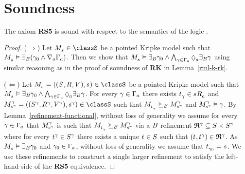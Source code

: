 \section{Soundness}\label{rml-s5-soundness}

\begin{lemma}\label{rml-s5-rs5}
The axiom {\bf RS5} is sound with respect to the semantics of the logic \logicRmlS{}.
\end{lemma}

\begin{proof}
($\Rightarrow$) 
Let $\kPModel{\kStateS} \in \classS$ be a pointed Kripke model such that $\kPModel{\kStateS} \entails \somerefsBs (\gamma_0 \land \coversA \Gamma_\agentA)$.
Then we show that $\kPModel{\kStateS} \entails \somerefsBs \gamma_0 \land \bigwedge_{\gamma \in \Gamma_\agentA} \possibleA \somerefsBs \gamma$ using similar reasoning as in the proof of soundness of {\bf RK} in Lemma~\ref{rml-k-rk}.

($\Leftarrow$)
Let $\kPModelAndTuple{\kStateS} \in \classS$ be a pointed Kripke model such that $\kPModel{\kStateS} \entails \somerefsBs \gamma_0 \land \bigwedge_{\gamma \in \Gamma_\agentA} \possibleA \somerefsBs \gamma$.
For every $\gamma \in \Gamma_\agentA$ there exists $\kStateT_\gamma \in \kSuccessorsA{\kStateS}$ and $\kPModelAndTuple[\gamma]{\kStateS[\gamma]} \in \classS$ such that $\kPModel{\kStateT_\gamma} \simulatesBs \kPModel[\gamma]{\kStateS[\gamma]}$ and $\kPModel[\gamma]{\kStateS[\gamma]} \entails \gamma$.
By Lemma~\ref{refinement-functional}, without loss of generality we assume for every $\gamma \in \Gamma_\agentA$ that $\kPModel[\gamma]{\kStateS[\gamma]}$ is such that $\kPModel{\kStateT_\gamma} \simulatesBs \kPModel[\gamma]{\kStateS[\gamma]}$ via a $\agentsB$-refinement $\refinement^{\gamma} \subseteq \kStates \times \kStates[\gamma]$ where for every $\kStateT[\gamma] \in \kStates[\gamma]$ there exists a unique $\kStateT \in \kStates$ such that $(\kStateT, \kStateT[\gamma]) \in \refinement^{\gamma}$.
As $\kPModel{\kStateS} \entails \somerefsBs \gamma_0$ and $\gamma_0 \in \Gamma_\agentA$, without loss of generality we assume that $\kStateT_{\gamma_0} = \kStateS$.
We use these refinements to construct a single larger refinement to satisfy the left-hand-side of the {\bf RS5} equivalence.


\end{proof}
